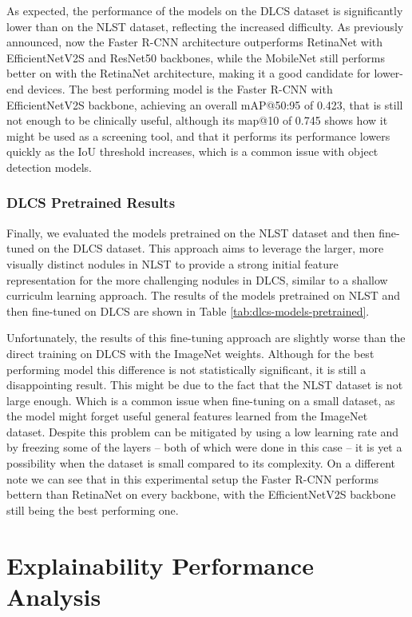 

As expected, the performance of the models on the DLCS dataset is significantly lower than on the NLST dataset, reflecting the increased difficulty. As previously announced, now the Faster R-CNN architecture outperforms RetinaNet with EfficientNetV2S and ResNet50 backbones, while the MobileNet still performs better on with the RetinaNet architecture, making it a good candidate for lower-end devices.
The best performing model is the Faster R-CNN with EfficientNetV2S backbone, achieving an overall mAP@50:95 of 0.423, that is still not enough to be clinically useful, although its map@10 of 0.745 shows how it might be used as a screening tool, and that it performs its performance lowers quickly as the IoU threshold increases, which is a common issue with object detection models.

\subsubsection{DLCS Pretrained Results}
Finally, we evaluated the models pretrained on the NLST dataset and then fine-tuned on the DLCS dataset. This approach aims to leverage the larger, more visually distinct nodules in NLST to provide a strong initial feature representation for the more challenging nodules in DLCS, similar to a shallow curriculm learning approach.
The results of the models pretrained on NLST and then fine-tuned on DLCS are shown in Table \ref{tab:dlcs-models-pretrained}.



Unfortunately, the results of this fine-tuning approach are slightly worse than the direct training on DLCS with the ImageNet weights. Although for the best performing model this difference is not statistically significant, it is still a disappointing result.
This might be due to the fact that the NLST dataset is not large enough. Which is a common issue when fine-tuning on a small dataset, as the model might forget useful general features learned from the ImageNet dataset. Despite this problem can be mitigated by using a low learning rate and by freezing some of the layers -- both of which were done in this case -- it is yet a possibility when the dataset is small compared to its complexity. 
On a different note we can see that in this experimental setup the Faster R-CNN performs bettern than RetinaNet on every backbone, with the EfficientNetV2S backbone still being the best performing one.


\section{Explainability Performance Analysis}
